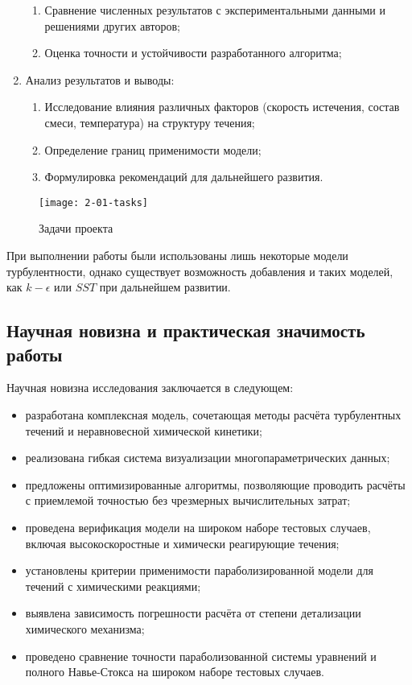\begin{enumerate}
\begin{enumerate}
        \item Сравнение численных результатов с экспериментальными данными и решениями других авторов;
        \item Оценка точности и устойчивости разработанного алгоритма;
    \end{enumerate}
    \item Анализ результатов и выводы:
    \begin{enumerate}
        \item Исследование влияния различных факторов (скорость истечения, состав смеси, температура) на структуру течения;
        \item Определение границ применимости модели;
        \item Формулировка рекомендаций для дальнейшего развития.
    \end{enumerate}
\end{enumerate}

\begin{figure}
    \texttt{[image: 2-01-tasks]}
    \caption{Задачи проекта}
    \label{fig:tasks}
\end{figure}

При выполнении работы были использованы лишь некоторые модели турбулентности, однако существует возможность добавления и таких моделей, как $k-\epsilon$ или $SST$ при дальнейшем развитии.

\subsection{Научная новизна и практическая значимость работы}

Научная новизна исследования заключается в следующем:

\begin{itemize}
    \item разработана комплексная модель, сочетающая методы расчёта турбулентных течений и неравновесной химической кинетики;
    \item реализована гибкая система визуализации многопараметрических данных;
    \item предложены оптимизированные алгоритмы, позволяющие проводить расчёты с приемлемой точностью без чрезмерных вычислительных затрат;
    \item проведена верификация модели на широком наборе тестовых случаев, включая высокоскоростные и химически реагирующие течения;
    \item установлены критерии применимости параболизированной модели для течений с химическими реакциями;
    \item выявлена зависимость погрешности расчёта от степени детализации химического механизма;
    \item проведено сравнение точности параболизованной системы уравнений и полного Навье-Стокса на широком наборе тестовых случаев.
\end{itemize}

